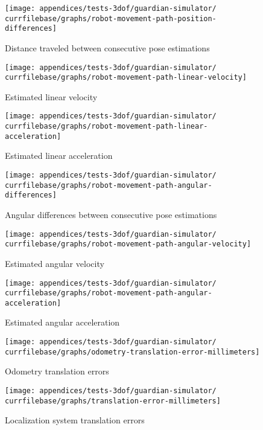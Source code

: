\begin{figure}[H]
	\centering
	\texttt{[image: appendices/tests-3dof/guardian-simulator/\\currfilebase/graphs/robot-movement-path-position-differences]}
	\caption{Distance traveled between consecutive pose estimations}
\end{figure}

\begin{figure}[H]
	\centering
	\texttt{[image: appendices/tests-3dof/guardian-simulator/\\currfilebase/graphs/robot-movement-path-linear-velocity]}
	\caption{Estimated linear velocity}
\end{figure}

\begin{figure}[H]
	\centering
	\texttt{[image: appendices/tests-3dof/guardian-simulator/\\currfilebase/graphs/robot-movement-path-linear-acceleration]}
	\caption{Estimated linear acceleration}
\end{figure}


\begin{figure}[H]
	\centering
	\texttt{[image: appendices/tests-3dof/guardian-simulator/\\currfilebase/graphs/robot-movement-path-angular-differences]}
	\caption{Angular differences between consecutive pose estimations}
\end{figure}

\begin{figure}[H]
	\centering
	\texttt{[image: appendices/tests-3dof/guardian-simulator/\\currfilebase/graphs/robot-movement-path-angular-velocity]}
	\caption{Estimated angular velocity}
\end{figure}

\begin{figure}[H]
	\centering
	\texttt{[image: appendices/tests-3dof/guardian-simulator/\\currfilebase/graphs/robot-movement-path-angular-acceleration]}
	\caption{Estimated angular acceleration}
\end{figure}


\begin{figure}[H]
	\centering
	\texttt{[image: appendices/tests-3dof/guardian-simulator/\\currfilebase/graphs/odometry-translation-error-millimeters]}
	\caption{Odometry translation errors}
\end{figure}

\begin{figure}[H]
	\centering
	\texttt{[image: appendices/tests-3dof/guardian-simulator/\\currfilebase/graphs/translation-error-millimeters]}
	\caption{Localization system translation errors}
\end{figure}


